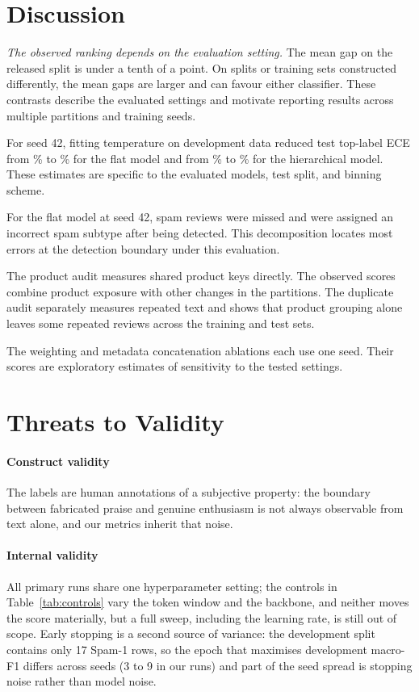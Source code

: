 \documentclass[12pt,a4paper]{article}
\begin{document}
\section{Discussion}
\label{sec:discussion}
\emph{The observed ranking depends on the evaluation setting.} The mean gap on the released split is under a tenth of a point. On splits or training sets constructed differently, the mean gaps are larger and can favour either classifier. These contrasts describe the evaluated settings and motivate reporting results across multiple partitions and training seeds.

For seed 42, fitting temperature on development data reduced test top-label ECE from \EceSingle\% to \EceFlatCal\% for the flat model and from \EceMulti\% to \EceCascCal\% for the hierarchical model. These estimates are specific to the evaluated models, test split, and binning scheme.

For the flat model at seed 42, \GateFN{} spam reviews were missed and \GateType{} were assigned an incorrect spam subtype after being detected. This decomposition locates most errors at the detection boundary under this evaluation.

The product audit measures shared product keys directly. The observed scores combine product exposure with other changes in the partitions. The duplicate audit separately measures repeated text and shows that product grouping alone leaves some repeated reviews across the training and test sets.

The weighting and metadata concatenation ablations each use one seed. Their scores are exploratory estimates of sensitivity to the tested settings.

\section{Threats to Validity}
\paragraph{Construct validity} The labels are human annotations of a subjective property: the boundary between fabricated praise and genuine enthusiasm is not always observable from text alone, and our metrics inherit that noise.

\paragraph{Internal validity} All primary runs share one hyperparameter setting; the controls in Table~\ref{tab:controls} vary the token window and the backbone, and neither moves the score materially, but a full sweep, including the learning rate, is still out of scope. Early stopping is a second source of variance: the development split contains only 17 Spam-1 rows, so the epoch that maximises development macro-F1 differs across seeds (3 to 9 in our runs) and part of the seed spread is stopping noise rather than model noise.
\end{document}
